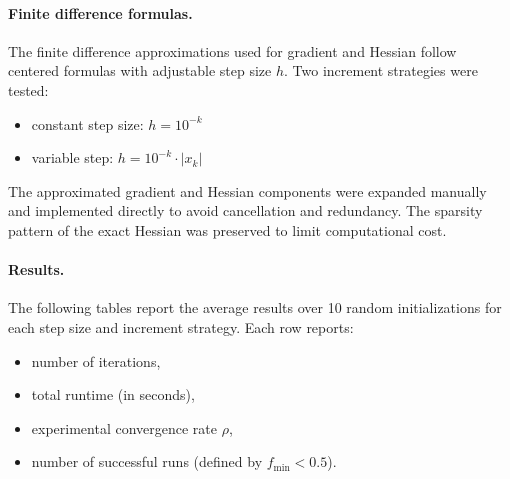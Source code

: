 \documentclass[a4paper,12pt]{article}
\begin{document}
	\paragraph{Finite difference formulas.}
	The finite difference approximations used for gradient and Hessian follow centered formulas with adjustable step size \( h \). Two increment strategies were tested:
	\begin{itemize}[nosep]
		\item constant step size: \( h = 10^{-k} \)
		\item variable step: \( h = 10^{-k} \cdot |x_k| \)
	\end{itemize}
	
	The approximated gradient and Hessian components were expanded manually and implemented directly to avoid cancellation and redundancy. The sparsity pattern of the exact Hessian was preserved to limit computational cost.
	
	\vspace{1em}
	
	\newpage
	\paragraph{Results.}
	The following tables report the average results over 10 random initializations for each step size and increment strategy. Each row reports:
	\begin{itemize}[nosep]
		\item number of iterations,
		\item total runtime (in seconds),
		\item experimental convergence rate \( \rho \),
		\item number of successful runs (defined by \( f_{\min} < 0.5 \)).
	\end{itemize}
	
\end{document}
